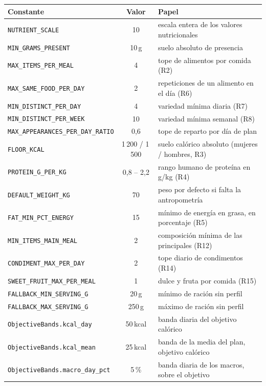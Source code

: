 \begin{table}[htbp]
\centering
\small
\begin{tabular}{|l|c|p{5.8cm}|}
\hline
\textbf{Constante} & \textbf{Valor} & \textbf{Papel} \\
\hline
\texttt{NUTRIENT\_SCALE} & 10 & escala entera de los valores nutricionales \\
\hline
\texttt{MIN\_GRAMS\_PRESENT} & 10\,g & suelo absoluto de presencia \\
\hline
\texttt{MAX\_ITEMS\_PER\_MEAL} & 4 & tope de alimentos por comida (R2) \\
\hline
\texttt{MAX\_SAME\_FOOD\_PER\_DAY} & 2 & repeticiones de un alimento en el día (R6) \\
\hline
\texttt{MIN\_DISTINCT\_PER\_DAY} & 4 & variedad mínima diaria (R7) \\
\hline
\texttt{MIN\_DISTINCT\_PER\_WEEK} & 10 & variedad mínima semanal (R8) \\
\hline
\texttt{MAX\_APPEARANCES\_PER\_DAY\_RATIO} & 0,6 & tope de reparto por día de plan \\
\hline
\texttt{FLOOR\_KCAL} & 1\,200 / 1\,500 & suelo calórico absoluto (mujeres / hombres, R3) \\
\hline
\texttt{PROTEIN\_G\_PER\_KG} & 0,8 -- 2,2 & rango humano de proteína en g/kg (R4) \\
\hline
\texttt{DEFAULT\_WEIGHT\_KG} & 70 & peso por defecto si falta la antropometría \\
\hline
\texttt{FAT\_MIN\_PCT\_ENERGY} & 15 & mínimo de energía en grasa, en porcentaje (R5) \\
\hline
\texttt{MIN\_ITEMS\_MAIN\_MEAL} & 2 & composición mínima de las principales (R12) \\
\hline
\texttt{CONDIMENT\_MAX\_PER\_DAY} & 2 & tope diario de condimentos (R14) \\
\hline
\texttt{SWEET\_FRUIT\_MAX\_PER\_MEAL} & 1 & dulce y fruta por comida (R15) \\
\hline
\texttt{FALLBACK\_MIN\_SERVING\_G} & 20\,g & mínimo de ración sin perfil \\
\hline
\texttt{FALLBACK\_MAX\_SERVING\_G} & 250\,g & máximo de ración sin perfil \\
\hline
\texttt{ObjectiveBands.kcal\_day} & 50\,kcal & banda diaria del objetivo calórico \\
\hline
\texttt{ObjectiveBands.kcal\_mean} & 25\,kcal & banda de la media del plan, objetivo calórico \\
\hline
\texttt{ObjectiveBands.macro\_day\_pct} & 5\,\% & banda diaria de los macros, sobre el objetivo \\

\end{tabular}
\end{table}

